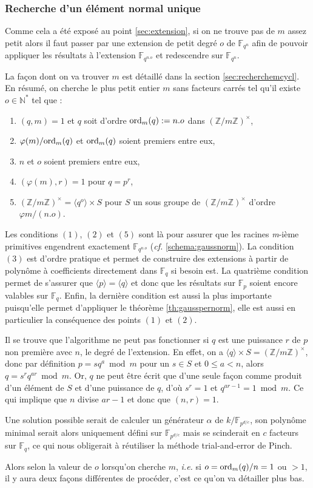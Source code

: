 \documentclass[a4paper]{article} %
\numberwithin{section}{part}
\numberwithin{equation}{section}
\newcommand\nroot[1]{\textit{#1}-ième}
\newcommand\zmodninv[1]{(\mathbb{Z}/#1\mathbb{Z})^{\times}}
\newcommand\GF[1]{\mathbb{F}_{#1}}
\newcommand\NN{\mathbb{N}}
\newcommand\groupgen[1]{\langle{#1}\rangle}
\newcommand\ord[2]{\textup{ord}_{#1}(#2)}
\begin{document}
\subsubsection*{Recherche d'un élément normal unique}
Comme cela a été exposé au point \ref{sec:extension}, si on ne trouve pas de $m$
assez petit alors il faut passer par une extension de petit degré $o$ de
$\GF{q^n}$ afin de pouvoir appliquer les résultats à l'extension $\GF{q^{n.o}}$
et redescendre sur $\GF{q^n}$.\par
La façon dont on va trouver $m$ est détaillé dans la section
\ref{sec:recherchemcycl}. En résumé, on cherche le plus petit entier
$m$ sans facteurs carrés tel qu'il existe $o\in\NN^*$ tel que :
\vspace{0.3cm}
\begin{enumerate}[(1)]
    \item $(q, m) = 1$ et $q$ soit d'ordre $\ord{m}{q} :=n.o$ dans 
    $\zmodninv{m}$,
    \item $\varphi(m)/\ord{m}{q}$ et $\ord{m}{q}$ soient premiers entre eux,
    \item $n$ et $o$ soient premiers entre eux,
    \item $(\varphi(m), r) = 1$ pour $q = p^r$,
    \item $\zmodninv{m} = \groupgen{q^o}\times S$ pour $S$ un sous groupe
    de $\zmodninv{m}$ d'ordre $\varphi{m}/(n.o)$.
\end{enumerate}
\vspace{0.3cm}
Les conditions $(1)$, $(2)$ et $(5)$ sont là pour assurer que les racines 
\nroot{m} primitives engendrent exactement $\GF{q^{n.o}}$ (\emph{cf.} 
\ref{schema:gaussnorm}). La condition $(3)$ est d'ordre pratique et permet de
construire des extensions à partir de polynôme à coefficients directement dans 
$\GF{q}$ si besoin est. La quatrième condition permet de s'assurer que
$\groupgen{p} = \groupgen{q}$ et donc que les résultats sur
$\GF{p}$ soient encore valables sur $\GF{q}$. Enfin, la dernière condition est
aussi la plus importante puisqu'elle permet d'appliquer le théorème 
\ref{th:gausspernorm}, elle est aussi en particulier la conséquence des points
$(1)$ et $(2)$.
\begin{rem}
Il se trouve que l'algorithme ne peut pas fonctionner si $q$ est une puissance 
$r$ de $p$ non première avec $n$, le degré de l'extension. En effet, on a 
$\groupgen{q}\times S = \zmodninv{m}$, donc par définition $p = sq^a\bmod 
m$ pour un $s\in S$ et $0 \leq a < n$, alors $q=s^rq^{ar} \bmod m$. 
Or, $q$ ne peut être écrit que d'une seule façon comme produit d'un élément de 
$S$ et d'une puissance de $q$, d'où $s^r = 1$ et $q^{ar - 1} = 1 \bmod m$. 
Ce qui implique que $n$ divise $ar - 1$ et donc que $(n, r) = 1$.\par
Une solution possible serait de calculer un générateur $\alpha$ de 
$k/\GF{p^{d/c}}$, son polynôme minimal serait alors uniquement défini sur 
$\GF{p^{d/c}}$ mais se scinderait en $c$ facteurs sur $\GF{q}$, ce qui nous 
obligerait à réutiliser la méthode trial-and-error de Pinch.
\end{rem}
\vspace{0.3cm}
Alors selon la valeur de $o$ lorsqu'on cherche $m$, \emph{i.e.} si $o = 
\ord{m}{q} /n = 1$ ou $> 1$, il y aura deux façons différentes de procéder, 
c'est ce qu'on va détailler plus bas.
\end{document}
